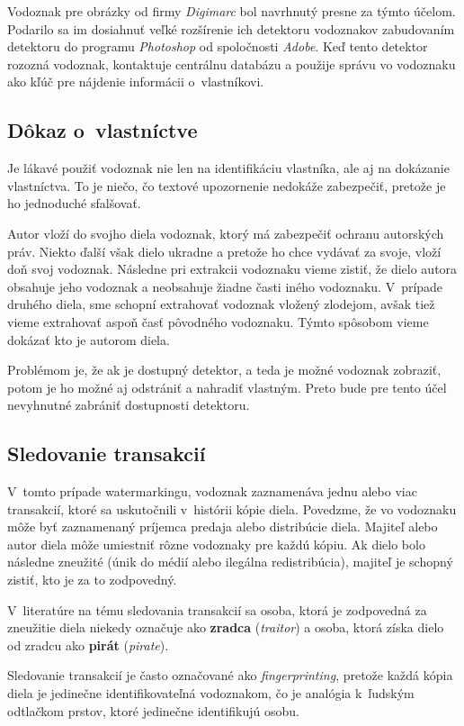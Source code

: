 Vodoznak pre obrázky od firmy {\it Digimarc} bol navrhnutý presne za týmto účelom. Podarilo sa im dosiahnuť veľké rozšírenie ich detektoru vodoznakov zabudovaním detektoru do programu {\it Photoshop} od spoločnosti {\it Adobe}. Keď tento detektor rozozná vodoznak, kontaktuje centrálnu databázu a použije správu vo vodoznaku ako kľúč pre nájdenie informácii o~vlastníkovi. \cite{Cox}

\subsection{Dôkaz o~vlastníctve}
Je lákavé použiť vodoznak nie len na identifikáciu vlastníka, ale aj na dokázanie vlastníctva. To je niečo, čo textové upozornenie nedokáže zabezpečiť, pretože je ho jednoduché sfalšovať.

Autor vloží do svojho diela vodoznak, ktorý má zabezpečiť ochranu autorských práv. Niekto ďalší však dielo ukradne a pretože ho chce vydávať za svoje, vloží doň svoj vodoznak. Následne pri extrakcii vodoznaku vieme zistiť, že dielo autora obsahuje jeho vodoznak a neobsahuje žiadne časti iného vodoznaku. V~prípade druhého diela, sme schopní extrahovať vodoznak vložený zlodejom, avšak tiež vieme extrahovať aspoň časť pôvodného vodoznaku. Týmto spôsobom vieme dokázať kto je autorom diela.

Problémom je, že ak je dostupný detektor, a teda je možné vodoznak zobraziť, potom je ho možné aj odstrániť a nahradiť vlastným. Preto bude pre tento účel nevyhnutné zabrániť dostupnosti detektoru. \cite{Cox}

\subsection{Sledovanie transakcií}
V~tomto prípade watermarkingu, vodoznak zaznamenáva jednu alebo viac transakcií, ktoré sa uskutočnili v~histórii kópie diela. Povedzme, že vo vodoznaku môže byť zaznamenaný príjemca predaja alebo distribúcie diela. Majiteľ alebo autor diela môže umiestniť rôzne vodoznaky pre každú kópiu. Ak dielo bolo následne zneužité (únik do médií alebo ilegálna redistribúcia), majiteľ je schopný zistiť, kto je za to zodpovedný.

V~literatúre na tému sledovania transakcií sa osoba, ktorá je zodpovedná za zneužitie diela niekedy označuje ako {\bf zradca} ({\it traitor}) a osoba, ktorá získa dielo od zradcu ako {\bf pirát} ({\it pirate}).

Sledovanie transakcií je často označované ako {\it fingerprinting}, pretože každá kópia diela je jedinečne identifikovateľná vodoznakom, čo je analógia k~ľudským odtlačkom prstov, ktoré jedinečne identifikujú osobu.

